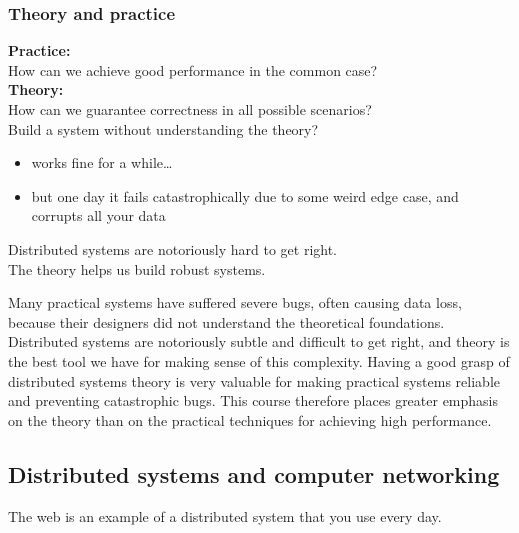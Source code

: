 \begin{frame}
    \label{s:theory-practice}
    \frametitle{Theory and practice}
    \textbf{Practice:}\\ How can we achieve good performance in the common case? \\[1em]
    \textbf{Theory:}\\ How can we guarantee correctness in all possible scenarios? \pause\\[1em]
    Build a system without understanding the theory?
    \begin{itemize}
        \item works fine for a while\dots\\
        \item but one day it fails catastrophically due to some weird edge case, and corrupts all your data
             \pause\\[1em]
    \end{itemize}
    Distributed systems are notoriously hard to get right.\\
    The theory helps us build robust systems.
\end{frame}
\label{l:theory-practice}

Many practical systems have suffered severe bugs, often causing data loss, because their designers did not understand the theoretical foundations.
Distributed systems are notoriously subtle and difficult to get right, and theory is the best tool we have for making sense of this complexity.
Having a good grasp of distributed systems theory is very valuable for making practical systems reliable and preventing catastrophic bugs.
This course therefore places greater emphasis on the theory than on the practical techniques for achieving high performance.

\subsection{Distributed systems and computer networking}\label{sec:networking}

The web is an example of a distributed system that you use every day.

